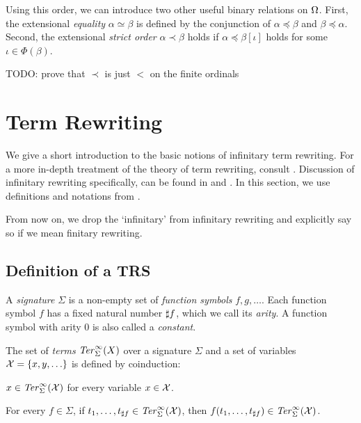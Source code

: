 Using this order, we can introduce two other useful binary relations
on $\Omega$. First, the extensional \emph{equality} $\alpha \simeq
\beta$ is defined by the conjunction of $\alpha \preceq \beta$ and
$\beta \preceq \alpha$. Second, the extensional \emph{strict order}
$\alpha \prec \beta$ holds if $\alpha \preceq \beta[\iota]$ holds for
some $\iota \in \Phi(\beta)$.

TODO: prove that $\prec$ is just $<$ on the finite ordinals


\section{Term Rewriting}\label{sec:rewriting}


We give a short introduction to the basic notions of infinitary term
rewriting. For a more in-depth treatment of the theory of term rewriting,
consult \citet{terese-03}. Discussion of infinitary rewriting
specifically, can be found in \citet[Chap. 12]{terese-03} and
\citet{klop-de-vrijer-05}. In this section, we use definitions and
notations from \citet{terese-03}.

From now on, we drop the `infinitary' from infinitary rewriting and
explicitly say so if we mean finitary rewriting.


\subsection{Definition of a TRS}\label{sub:trs}

\begin{definition}%
A \emph{signature} $\Sigma$ is a non-empty set of \emph{function symbols} $f,
g, \ldots$. Each function symbol $f$ has a fixed natural number
$\sharp f$, which we call its \emph{arity}. A function symbol with
arity $0$ is also called a \emph{constant}.
\end{definition}

\begin{definition}%
The set of \emph{terms} $\mathit{Ter}_\Sigma^\infty(X)$ over a signature $\Sigma$ and a
set of variables $\mathcal{X} = \{x, y, \ldots\}$ is defined by coinduction:
\begin{compactenum}
  \item
    $x \in \mathit{Ter}_\Sigma^\infty(\mathcal{X})$ for every variable $x \in \mathcal{X}$.
  \item
    For every $f \in \Sigma$, if $t_1, \ldots, t_{\sharp f} \in
    \mathit{Ter}_\Sigma^\infty(\mathcal{X})$, then $f(t_1, \ldots, t_{\sharp f}) \in \mathit{Ter}_\Sigma^\infty(\mathcal{X})$.
\end{compactenum}
\end{definition}

